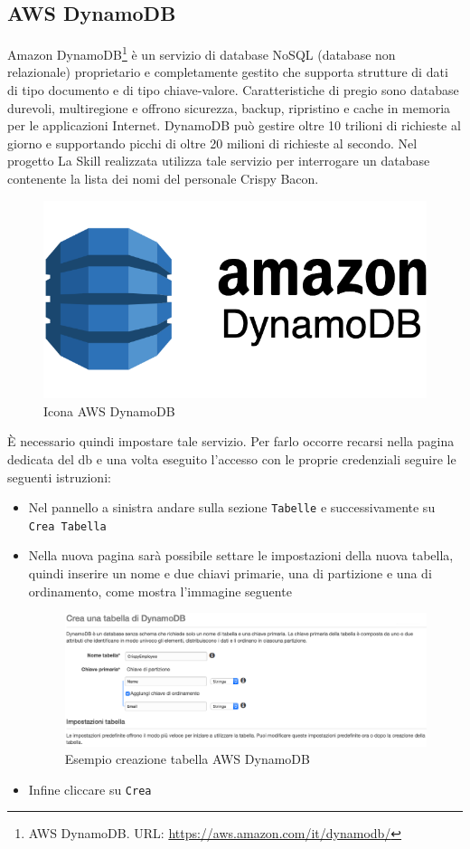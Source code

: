 \subsection{AWS DynamoDB}
Amazon DynamoDB\footnote{AWS DynamoDB. URL: \href{https://aws.amazon.com/it/dynamodb/}{https://aws.amazon.com/it/dynamodb/}} è un servizio di database NoSQL (database non relazionale) proprietario e completamente gestito che supporta strutture di dati di tipo documento e di tipo chiave-valore. Caratteristiche di pregio sono database durevoli, multiregione e offrono sicurezza, backup, ripristino e cache in memoria per le applicazioni Internet. DynamoDB può gestire oltre 10 trilioni di richieste al giorno e supportando picchi di oltre 20 milioni di richieste al secondo. Nel progetto La Skill realizzata utilizza tale servizio per interrogare un database contenente la lista dei nomi del personale Crispy Bacon. 
\begin{figure}[H] 
    \centering 
    \includegraphics[width=0.8\columnwidth]{immagini/amazon-dynamodb.png}
    \caption{\label{fig:icona_aws_dynamo}Icona AWS DynamoDB}
\end{figure}
\noindent È necessario quindi impostare tale servizio. Per farlo occorre recarsi nella pagina dedicata del db e una volta eseguito l'accesso con le proprie credenziali seguire le seguenti istruzioni:
\begin{itemize}
	\item Nel pannello a sinistra andare sulla sezione \texttt{Tabelle} e successivamente su \texttt{Crea Tabella}
	\item Nella nuova pagina sarà possibile settare le impostazioni della nuova tabella, quindi inserire un nome e due chiavi primarie, una di partizione e una di ordinamento, come mostra l'immagine seguente
	\begin{figure}[H] 
        \centering 
        \includegraphics[width=1\columnwidth]{immagini/aws_dynamo.png}
	    \caption{\label{fig:esempio_aws_dynamo}Esempio creazione tabella AWS DynamoDB}
    \end{figure}
	
	\item Infine cliccare su \texttt{Crea}
\end{itemize}

